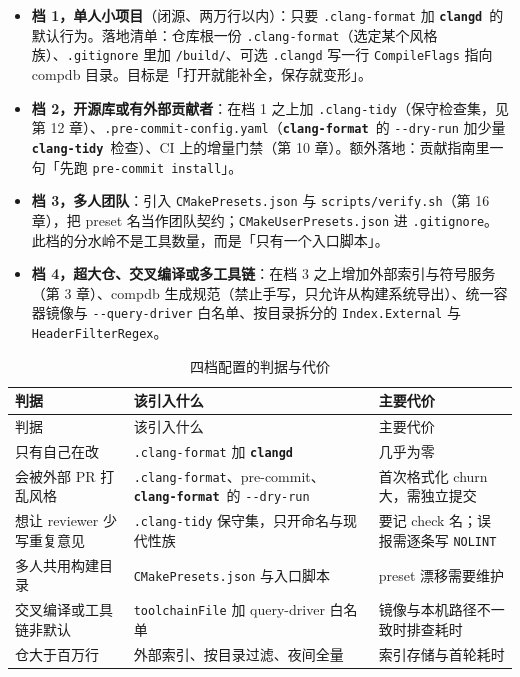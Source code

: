 \documentclass[12pt,a4paper,fontset=fandol]{ctexbook}
\newcommand{\Opt}[1]{\texttt{-\/-#1}}
\newcommand{\Lib}[1]{\textbf{\texttt{#1}}}
\newcommand{\Tidy}{\Lib{clang-tidy}}
\newcommand{\Fmt}{\Lib{clang-format}}
\newcommand{\CD}{\Lib{clangd}}
\begin{document}
\begin{itemize}
  \item \textbf{档 1，单人小项目}（闭源、两万行以内）：只要 \texttt{.clang-format} 加 \CD\ 的默认行为。落地清单：仓库根一份 \texttt{.clang-format}（选定某个风格族）、\texttt{.gitignore} 里加 \texttt{/build/}、可选 \texttt{.clangd} 写一行 \texttt{CompileFlags} 指向 compdb 目录。目标是「打开就能补全，保存就变形」。
  \item \textbf{档 2，开源库或有外部贡献者}：在档 1 之上加 \texttt{.clang-tidy}（保守检查集，见第 12 章）、\texttt{.pre-commit-config.yaml}（\Fmt\ 的 \Opt{dry-run} 加少量 \Tidy\ 检查）、CI 上的增量门禁（第 10 章）。额外落地：贡献指南里一句「先跑 \texttt{pre-commit install}」。
  \item \textbf{档 3，多人团队}：引入 \texttt{CMake\-\allowbreak Presets.json} 与 \texttt{scripts/verify.sh}（第 16 章），把 preset 名当作团队契约；\texttt{CMakeUserPresets.json} 进 \texttt{.gitignore}。此档的分水岭不是工具数量，而是「只有一个入口脚本」。
  \item \textbf{档 4，超大仓、交叉编译或多工具链}：在档 3 之上增加外部索引与符号服务（第 3 章）、compdb 生成规范（禁止手写，只允许从构建系统导出）、统一容器镜像与 \Opt{query-driver} 白名单、按目录拆分的 \texttt{Index.External} 与 \texttt{HeaderFilterRegex}。
\end{itemize}

{\footnotesize
\begin{longtable}{@{}>{\raggedright\arraybackslash}p{}
                  >{\raggedright\arraybackslash}p{}
                  >{\raggedright\arraybackslash}p{}@{}}
\caption{四档配置的判据与代价}\label{tab:ch17-pick}\\
\toprule
判据 & 该引入什么 & 主要代价 \\
\midrule
\endfirsthead
\toprule
判据 & 该引入什么 & 主要代价 \\
\midrule
\endhead
\bottomrule
\endlastfoot
只有自己在改 & \texttt{.clang-format} 加 \CD & 几乎为零 \\
会被外部 PR 打乱风格 & \texttt{.clang-format}、pre-commit、\Fmt\ 的 \Opt{dry-run} & 首次格式化 churn 大，需独立提交 \\
想让 reviewer 少写重复意见 & \texttt{.clang-tidy} 保守集，只开命名与现代性族 & 要记 check 名；误报需逐条写 \texttt{NOLINT} \\
多人共用构建目录 & \texttt{CMakePresets.json} 与入口脚本 & preset 漂移需要维护 \\
交叉编译或工具链非默认 & \texttt{toolchainFile} 加 query-driver 白名单 & 镜像与本机路径不一致时排查耗时 \\
仓大于百万行 & 外部索引、按目录过滤、夜间全量 & 索引存储与首轮耗时 \\
\end{longtable}
}
\end{document}

